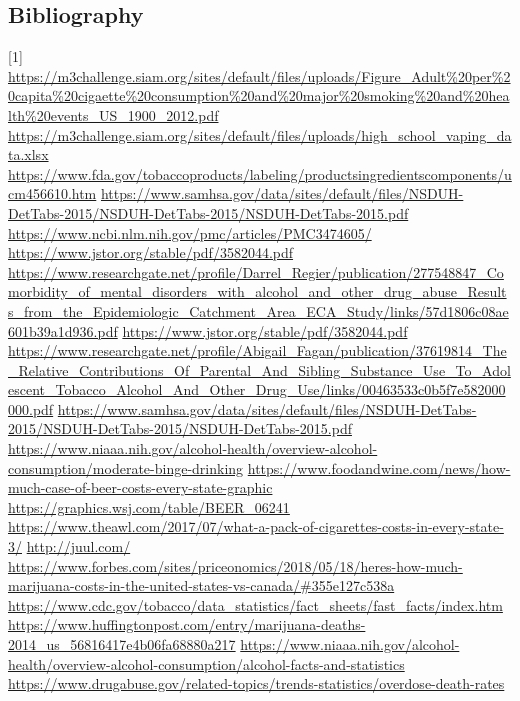 \subsection{Bibliography}
[1] \url{https://m3challenge.siam.org/sites/default/files/uploads/Figure_Adult%20per%20capita%20cigaette%20consumption%20and%20major%20smoking%20and%20health%20events_US_1900_2012.pdf}
\newline
[2]  \url{https://m3challenge.siam.org/sites/default/files/uploads/high_school_vaping_data.xlsx}
\newline
[3] \url{https://www.fda.gov/tobaccoproducts/labeling/productsingredientscomponents/ucm456610.htm}
\newline
[4] \url{https://www.samhsa.gov/data/sites/default/files/NSDUH-DetTabs-2015/NSDUH-DetTabs-2015/NSDUH-DetTabs-2015.pdf}
\newline
[5] \url{https://www.ncbi.nlm.nih.gov/pmc/articles/PMC3474605/}
\newline
[6] \url{https://www.jstor.org/stable/pdf/3582044.pdf} \url{https://www.researchgate.net/profile/Darrel_Regier/publication/277548847_Comorbidity_of_mental_disorders_with_alcohol_and_other_drug_abuse_Results_from_the_Epidemiologic_Catchment_Area_ECA_Study/links/57d1806c08ae601b39a1d936.pdf}
\newline
[7]  \url{https://www.jstor.org/stable/pdf/3582044.pdf}
\newline
[8] \url{https://www.researchgate.net/profile/Abigail_Fagan/publication/37619814_The_Relative_Contributions_Of_Parental_And_Sibling_Substance_Use_To_Adolescent_Tobacco_Alcohol_And_Other_Drug_Use/links/00463533c0b5f7e582000000.pdf}
\newline
[10] \url{https://www.samhsa.gov/data/sites/default/files/NSDUH-DetTabs-2015/NSDUH-DetTabs-2015/NSDUH-DetTabs-2015.pdf}
\newline
[11] \url{https://www.niaaa.nih.gov/alcohol-health/overview-alcohol-consumption/moderate-binge-drinking}
\newline
[12] \url{https://www.foodandwine.com/news/how-much-case-of-beer-costs-every-state-graphic}
\newline
[13] \url{https://graphics.wsj.com/table/BEER_06241}
\newline
[14] \url{https://www.theawl.com/2017/07/what-a-pack-of-cigarettes-costs-in-every-state-3/}
\newline
[15] \url{http://juul.com/}
\newline
[16] \url{https://www.forbes.com/sites/priceonomics/2018/05/18/heres-how-much-marijuana-costs-in-the-united-states-vs-canada/#355e127c538a}
\newline
[17] \url{https://www.cdc.gov/tobacco/data_statistics/fact_sheets/fast_facts/index.htm}
\newline
[18] \url{https://www.huffingtonpost.com/entry/marijuana-deaths-2014_us_56816417e4b06fa68880a217}
\newline
[19] \url{https://www.niaaa.nih.gov/alcohol-health/overview-alcohol-consumption/alcohol-facts-and-statistics}
\newline
[20] \url{https://www.drugabuse.gov/related-topics/trends-statistics/overdose-death-rates}
\newline

